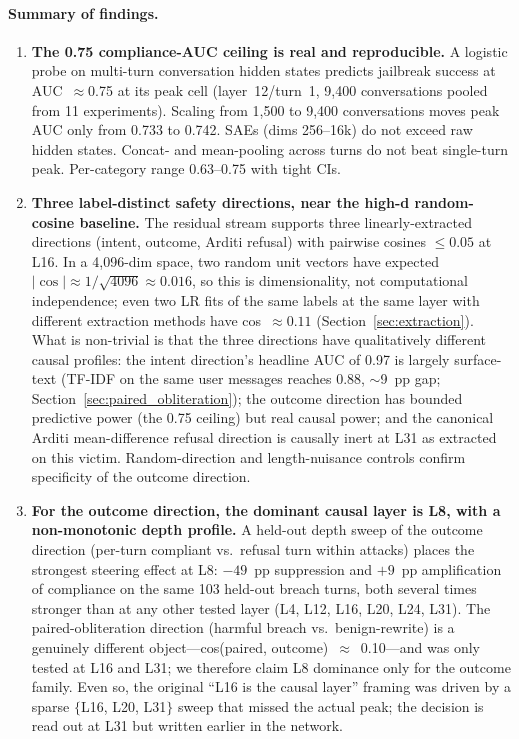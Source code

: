 \documentclass[11pt]{article}
\begin{document}
\paragraph{Summary of findings.}
\begin{enumerate}[leftmargin=*]
  \item \textbf{The 0.75 compliance-AUC ceiling is real and reproducible.} A logistic probe on multi-turn conversation hidden states predicts jailbreak success at AUC~$\approx$0.75 at its peak cell (layer~12/turn~1, 9{,}400 conversations pooled from 11 experiments). Scaling from 1{,}500 to 9{,}400 conversations moves peak AUC only from 0.733 to 0.742. SAEs (dims 256--16k) do not exceed raw hidden states. Concat- and mean-pooling across turns do not beat single-turn peak. Per-category range 0.63--0.75 with tight CIs.

  \item \textbf{Three label-distinct safety directions, near the high-d random-cosine baseline.} The residual stream supports three linearly-extracted directions (intent, outcome, Arditi refusal) with pairwise cosines $\le 0.05$ at L16. In a 4{,}096-dim space, two random unit vectors have expected $|\cos| \approx 1/\sqrt{4096} \approx 0.016$, so this is dimensionality, not computational independence; even two LR fits of the same labels at the same layer with different extraction methods have cos~$\approx 0.11$ (Section~\ref{sec:extraction}). What is non-trivial is that the three directions have qualitatively different causal profiles: the intent direction's headline AUC of 0.97 is largely surface-text (TF-IDF on the same user messages reaches 0.88, $\sim$9~pp gap; Section~\ref{sec:paired_obliteration}); the outcome direction has bounded predictive power (the 0.75 ceiling) but real causal power; and the canonical Arditi mean-difference refusal direction is causally inert at L31 as extracted on this victim. Random-direction and length-nuisance controls confirm specificity of the outcome direction.

  \item \textbf{For the outcome direction, the dominant causal layer is L8, with a non-monotonic depth profile.} A held-out depth sweep of the outcome direction (per-turn compliant vs.\ refusal turn within attacks) places the strongest steering effect at L8: $-49$~pp suppression and $+9$~pp amplification of compliance on the same 103 held-out breach turns, both several times stronger than at any other tested layer (L4, L12, L16, L20, L24, L31). The paired-obliteration direction (harmful breach vs.\ benign-rewrite) is a genuinely different object---cos(paired, outcome)~$\approx$~0.10---and was only tested at L16 and L31; we therefore claim L8 dominance only for the outcome family. Even so, the original ``L16 is the causal layer'' framing was driven by a sparse $\{$L16, L20, L31$\}$ sweep that missed the actual peak; the decision is read out at L31 but written earlier in the network.


\end{enumerate}
\end{document}
